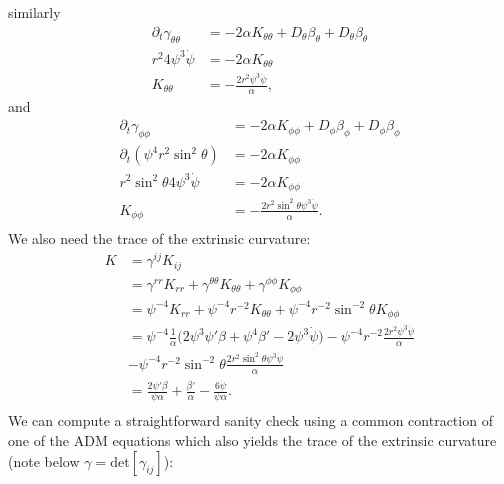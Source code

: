\documentclass[12pt]{article}
\numberwithin{equation}{section}
\begin{document}
similarly
\begin{equation}
\begin{aligned}
\partial_t \gamma_{\theta \theta} &= -2 \alpha K_{\theta \theta} + D_\theta \beta_\theta + D_\theta \beta_\theta \\
r^2 4 \psi^3 \dot{\psi} &= -2 \alpha K_{\theta \theta}\\
K_{\theta \theta} &= - \frac{2 r^2 \psi^3 \dot{\psi}}{\alpha},
\end{aligned}
\end{equation}
and
\begin{equation}
\begin{aligned}
\partial_t \gamma_{\phi \phi} &= -2 \alpha K_{\phi \phi} + D_\phi \beta_\phi + D_\phi \beta_\phi \\
\partial_t (\psi^4 r^2 \sin^2 \theta) &= -2 \alpha K_{\phi \phi} \\
r^2 \sin^2 \theta 4 \psi^3 \dot{\psi} &= -2 \alpha K_{\phi \phi} \\
K_{\phi \phi} &= - \frac{2 r^2 \sin^2 \theta \psi^3 \dot{\psi}}{\alpha}. \\
\end{aligned}
\end{equation}
We also need the trace of the extrinsic curvature:
\begin{equation}
\begin{aligned}
K &= \gamma^{ij} K_{ij} \\
&= \gamma^{rr} K_{rr} + \gamma^{\theta \theta} K_{\theta \theta} + \gamma^{\phi \phi} K_{\phi \phi} \\
&= \psi^{-4} K_{rr} + \psi^{-4} r^{-2} K_{\theta \theta} + \psi^{-4} r^{-2} \sin^{-2} \theta K_{\phi \phi} \\
&= \psi^{-4} \frac{1}{\alpha} \Big( 2 \psi^3 \psi' \beta + \psi^4 \beta' - 2 \psi^3 \dot{\psi} \Big)  - \psi^{-4} r^{-2} \frac{2 r^2 \psi^3 \dot{\psi}}{\alpha} \\
&- \psi^{-4} r^{-2} \sin^{-2} \theta \frac{2 r^2 \sin^2 \theta \psi^3 \dot{\psi}}{\alpha} \\
&= \frac{2 \psi' \beta}{\psi \alpha} + \frac{\beta'}{\alpha} - \frac{6 \dot{\psi}}{\psi \alpha}. \\
\end{aligned}
\end{equation}
We can compute a straightforward sanity check using a common contraction of one of the ADM equations which also yields the trace of the extrinsic curvature (note below $\gamma = \mathrm{det}[\gamma_{ij}]$):
\end{document}
